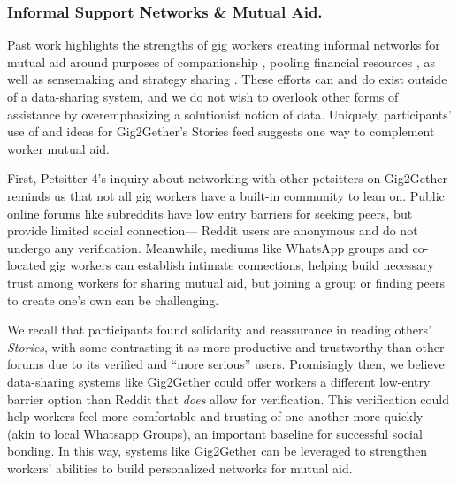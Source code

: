 {
\subsubsection{Informal Support Networks \& Mutual Aid.} Past work highlights the strengths of gig workers creating informal networks for mutual aid around purposes of companionship \cite{qadri2021s, atom}, pooling financial resources \cite{gray2019ghost, seetharaman2021delivery}, as well as sensemaking and strategy sharing \cite{mohlmannn2023algorithm}. These efforts can and do exist outside of a data-sharing system, and we do not wish to overlook other forms of assistance by overemphasizing a solutionist notion of data. Uniquely, participants' use of and ideas for Gig2Gether’s Stories feed suggests one way to complement worker mutual aid. 

First, Petsitter-4's inquiry about networking with other petsitters on Gig2Gether reminds us that not all gig workers have a built-in community to lean on. Public online forums like subreddits have low entry barriers for seeking peers, but provide limited social connection--- Reddit users are anonymous and do not undergo any verification. Meanwhile, mediums like WhatsApp groups and co-located gig workers can establish intimate connections, helping build necessary trust among workers for sharing mutual aid, but joining a group or finding peers to create one's own can be challenging. 

We recall that participants found solidarity and reassurance in reading others' \textit{Stories}, with some contrasting it as more productive and trustworthy than other forums due to its verified and ``more serious'' users. Promisingly then, we believe data-sharing systems like Gig2Gether could offer workers a different low-entry barrier option than Reddit that \textit{does} allow for verification. This verification could help workers feel more comfortable and trusting of one another more quickly (akin to local Whatsapp Groups), an important baseline for successful social bonding. In this way, systems like Gig2Gether can be leveraged to strengthen workers' abilities to build personalized networks for mutual aid.



}

